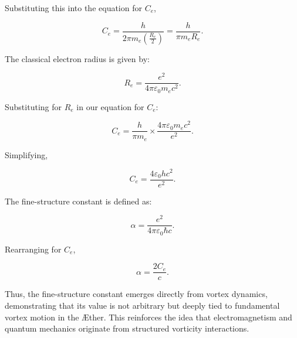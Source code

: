 Substituting this into the equation for $C_e$,

\begin{equation}
    C_e = \frac{h}{2 \pi m_e \left(\frac{R_e}{2}\right)} = \frac{h}{\pi m_e R_e}.
\end{equation}

The classical electron radius is given by:

\begin{equation}
    R_e = \frac{e^2}{4 \pi \varepsilon_0 m_e c^2}.
\end{equation}

Substituting for $R_e$ in our equation for $C_e$:

\begin{equation}
    C_e = \frac{h}{\pi m_e} \times \frac{4 \pi \varepsilon_0 m_e c^2}{e^2}.
\end{equation}

Simplifying,

\begin{equation}
    C_e = \frac{4 \varepsilon_0 h c^2}{e^2}.
\end{equation}

The fine-structure constant is defined as:

\begin{equation}
    \alpha = \frac{e^2}{4 \pi \varepsilon_0 \hbar c}.
\end{equation}

Rearranging for $C_e$,

\begin{equation}
    \alpha = \frac{2 C_e}{c}.
\end{equation}

Thus, the fine-structure constant emerges directly from vortex dynamics, demonstrating that its value is not arbitrary but deeply tied to fundamental vortex motion in the \AE ther. This reinforces the idea that electromagnetism and quantum mechanics originate from structured vorticity interactions.